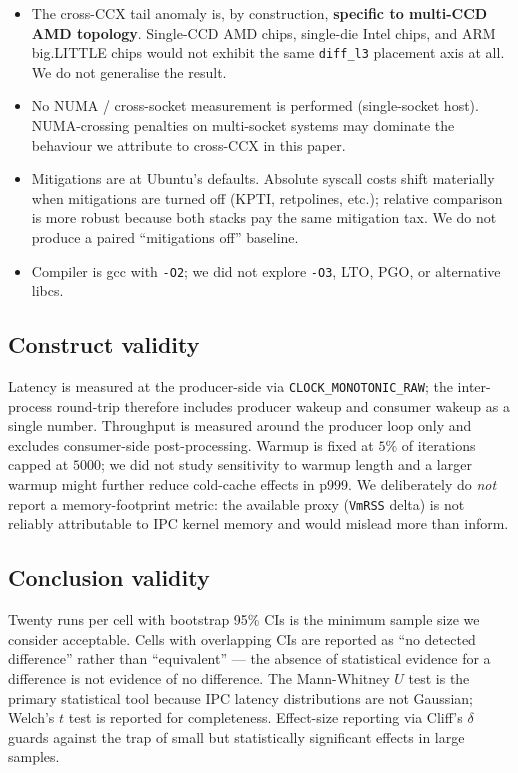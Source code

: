\documentclass[a4paper,11pt]{article}
\begin{document}
\begin{itemize}[leftmargin=*]
\item The cross-CCX tail anomaly is, by construction, \textbf{specific
to multi-CCD AMD topology}. Single-CCD AMD chips, single-die Intel
chips, and ARM big.LITTLE chips would not exhibit the same
\texttt{diff\_l3} placement axis at all. We do not generalise the
result.
\item No NUMA / cross-socket measurement is performed (single-socket
host). NUMA-crossing penalties on multi-socket systems may dominate the
behaviour we attribute to cross-CCX in this paper.
\item Mitigations are at Ubuntu's defaults. Absolute syscall costs
shift materially when mitigations are turned off (KPTI, retpolines,
etc.); relative comparison is more robust because both stacks pay the
same mitigation tax. We do not produce a paired ``mitigations off''
baseline.
\item Compiler is gcc with \texttt{-O2}; we did not explore \texttt{-O3},
LTO, PGO, or alternative libcs.
\end{itemize}

\subsection{Construct validity}
Latency is measured at the producer-side via
\texttt{CLOCK\_MONOTONIC\_RAW}; the inter-process round-trip therefore
includes producer wakeup and consumer wakeup as a single number.
Throughput is measured around the producer loop only and excludes
consumer-side post-processing. Warmup is fixed at $5\%$ of iterations
capped at $5000$; we did not study sensitivity to warmup length and a
larger warmup might further reduce cold-cache effects in p999. We
deliberately do \emph{not} report a memory-footprint metric: the
available proxy (\texttt{VmRSS} delta) is not reliably attributable to
IPC kernel memory and would mislead more than inform.

\subsection{Conclusion validity}
Twenty runs per cell with bootstrap 95\% CIs is the minimum sample
size we consider acceptable. Cells with overlapping CIs are reported
as ``no detected difference'' rather than ``equivalent'' --- the
absence of statistical evidence for a difference is not evidence of
no difference. The Mann-Whitney $U$ test is the primary statistical
tool because IPC latency distributions are not Gaussian; Welch's
$t$ test is reported for completeness. Effect-size reporting via
Cliff's $\delta$ guards against the trap of small but statistically
significant effects in large samples.
\end{document}
